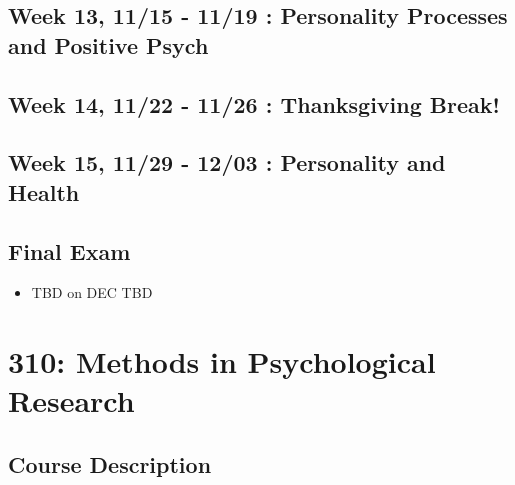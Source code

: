 \documentclass[
]{book}
\providecommand{\tightlist}{%
  \setlength{\itemsep}{0pt}\setlength{\parskip}{0pt}}
\begin{document}
\hypertarget{week-13-1115---1119-personality-processes-and-positive-psych}{%
\section*{Week 13, 11/15 - 11/19 : Personality Processes and Positive Psych}\label{week-13-1115---1119-personality-processes-and-positive-psych}}

\hypertarget{week-14-1122---1126-thanksgiving-break}{%
\section*{Week 14, 11/22 - 11/26 : Thanksgiving Break!}\label{week-14-1122---1126-thanksgiving-break}}

\hypertarget{week-15-1129---1203-personality-and-health}{%
\section*{Week 15, 11/29 - 12/03 : Personality and Health}\label{week-15-1129---1203-personality-and-health}}

\hypertarget{final-exam}{%
\section*{Final Exam}\label{final-exam}}

\begin{itemize}
\tightlist
\item
  TBD on DEC TBD
\end{itemize}

\hypertarget{statsminor}{%
\chapter*{310: Methods in Psychological Research}\label{statsminor}}

\hypertarget{course-description-1}{%
\section{Course Description}\label{course-description-1}}
\end{document}
